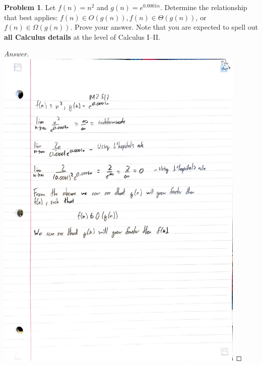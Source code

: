 \documentclass[11pt]{article}
\theoremstyle{definition}
\theoremstyle{definition}
\newtheorem{required}{Problem}
\theoremstyle{definition}
\newcommand{\standard}{13}
\begin{document}
\setcounter{required}{\standard-1}
\begin{required} 
Let $f(n) = n^2$ and $g(n) = e^{0.0001 n}$. Determine the relationship that best applies: $f(n) \in O(g(n)), f(n) \in \Theta(g(n))$, or $f(n) \in \Omega(g(n))$. Prove your answer.
Note that you are expected to spell out \textbf{all Calculus details} at the level of Calculus I--II.

    \begin{proof}[Answer]
    \includegraphics[width=0.9\textwidth]{M2S13.pdf}
\end{proof}

\end{required}




\end{document}
